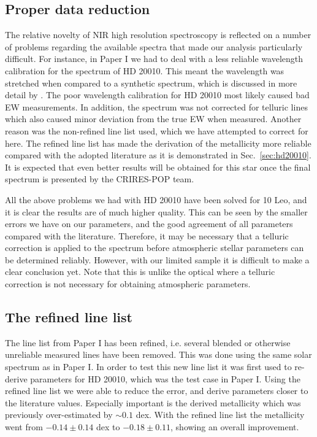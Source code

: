 \documentclass{aa}
\begin{document}
\subsection{Proper data reduction}

The relative novelty of NIR high resolution spectroscopy is reflected on a
number of problems regarding the available spectra that made our analysis
particularly difficult. For instance, in Paper I we had to deal with a less
reliable wavelength calibration for the spectrum of HD 20010. This meant the
wavelength was stretched when compared to a synthetic spectrum, which is
discussed in more detail by \citet{Nicholls2017}. The poor wavelength
calibration for HD 20010 most likely caused bad EW measurements. In addition,
the spectrum was not corrected for telluric lines which also caused minor
deviation from the true EW when measured. Another reason was the non-refined
line list used, which we have attempted to correct for here. The refined line
list has made the derivation of the metallicity more reliable compared with the
adopted literature as it is demonstrated in Sec.~\ref{sec:hd20010}. It is
expected that even better results will be obtained for this star once the final
spectrum is presented by the CRIRES-POP team.

All the above problems we had with HD 20010 have been solved for 10 Leo, and it
is clear the results are of much higher quality. This can be seen by the smaller
errors we have on our parameters, and the good agreement of all parameters
compared with the literature. Therefore, it may be necessary that a telluric
correction is applied to the spectrum before atmospheric stellar parameters can
be determined reliably. However, with our limited sample it is difficult to make
a clear conclusion yet. Note that this is unlike the optical where a telluric
correction is not necessary for obtaining atmospheric parameters.


\subsection{The refined line list}

The line list from Paper I has been refined, i.e. several blended or
otherwise unreliable measured lines have been removed. This was done using the
same solar spectrum as in Paper I. In order to test this new line list it was
first used to re-derive parameters for HD 20010, which was the test case in
Paper I. Using the refined line list we were able to reduce the error, and
derive parameters closer to the literature values. Especially important is the
derived metallicity which was previously over-estimated by $\sim0.1$ dex. With
the refined line list the metallicity went from $-0.14\pm0.14$ dex to
$-0.18\pm0.11$, showing an overall improvement.
\end{document}
